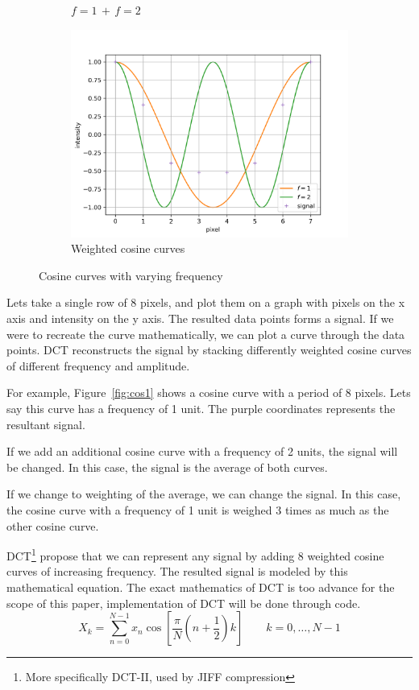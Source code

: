 \documentclass{article}
\begin{document}
\begin{figure}[h]
\begin{subfigure}[b]{0.30\textwidth}
	\caption{$f=1\, + \, f = 2$}
	\label{fig:cos2}
\end{subfigure}
\begin{subfigure}[b]{0.30\textwidth}
	\centering
	\includegraphics[width=\textwidth]{./figures/dct/cos3}
	\caption{Weighted cosine curves}
	\label{fig:cos3}
\end{subfigure}
\caption{Cosine curves with varying frequency}
\end{figure}

Lets take a single row of 8 pixels, and plot them on a graph with pixels on the x axis and intensity on the y axis.
The resulted data points forms a signal.
If we were to recreate the curve mathematically, we can plot a curve through the data points.
DCT reconstructs the signal by stacking differently weighted cosine curves of different frequency and amplitude.

For example, Figure~\ref{fig:cos1} shows a cosine curve with a period of 8 pixels.
Lets say this curve has a frequency of 1 unit.
The purple coordinates represents the resultant signal.

If we add an additional cosine curve with a frequency of 2 units, the signal will be changed.
In this case, the signal is the average of both curves.

If we change to weighting of the average, we can change the signal.
In this case, the cosine curve with a frequency of 1 unit is weighed 3 times as much as the other cosine curve.

DCT\footnote{More specifically DCT-II, used by JIFF compression} propose that we can represent any signal by adding 8 weighted cosine curves of increasing frequency.
The resulted signal is modeled by this mathematical equation.
The exact mathematics of DCT is too advance for the scope of this paper, implementation of DCT will be done through code.
\begin{equation}
	X_k = \sum_{n=0}^{N-1} x_n \cos \left [ \frac{\pi}{N} \left ( n + \frac{1}{2} \right ) k \right ] \qquad k = 0, \dots , N - 1
\end{equation}
\end{document}
